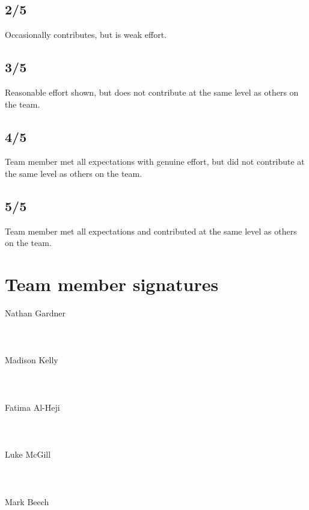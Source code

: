\documentclass[conference]{IEEEtran}
\begin{document}
\subsection{2/5}
Occasionally contributes, but is weak effort. 
\subsection{3/5}
Reasonable effort shown, but does not contribute at the same level as others on the team.
\subsection{4/5}
Team member met all expectations with genuine effort, but did not contribute at the same level as others on the team.
\subsection{5/5}
Team member met all expectations and contributed at the same level as others on the team.
\section{Team member signatures}
Nathan Gardner
\\
\\
\\
\\
Madison Kelly
\\
\\
\\
\\
Fatima Al-Heji
\\
\\
\\
\\
Luke McGill 
\\
\\
\\
\\
Mark Beech

%
%
\end{document}
